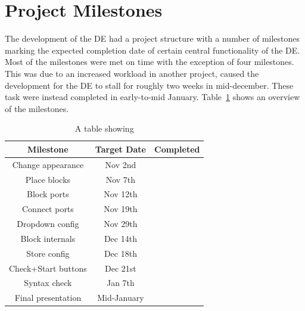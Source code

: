 \documentclass[journal,comsoc]{IEEEtran}
\begin{document}
%
\newpage
\appendices
\section{Project Milestones}
\label{app:milestones}
The development of the DE had a project structure with a number of milestones marking the
expected completion date of certain central functionality of the DE. Most of the milestones
were met on time with the exception of four milestones. This was due to an increased workload
in another project, caused the development for the DE to stall for roughly two weeks in
mid-december. These task were instead completed in early-to-mid January. Table~\ref{tab:milestones} shows an overview of the milestones.

\begin{table}[!ht]
\renewcommand{\arraystretch}{1.3}
\caption{A table showing}
\label{tab:milestones}
\centering
\begin{tabular}{|c|c|c|} \hline
		\textbf{Milestone} & \textbf{Target Date} & \textbf{Completed} \\ \hline
		Change appearance & Nov 2nd & \color{green}{In Time} \\ \hline
		Place blocks & Nov 7th & \color{green}{In Time} \\ \hline
		Block ports & Nov 12th & \color{green}{In Time} \\ \hline
		Connect ports & Nov 19th & \color{green}{In Time} \\ \hline
		Dropdown config & Nov 29th & \color{green}{In Time} \\ \hline
		Block internals & Dec 14th & \color{blue}{Early/Mid January} \\ \hline
		Store config & Dec 18th & \color{blue}{Early/Mid January} \\ \hline
		Check+Start buttons & Dec 21st & \color{blue}{Early/Mid January} \\ \hline
		Syntax check & Jan 7th & \color{blue}{Early/Mid January} \\ \hline
		Final presentation & Mid-January & \color{green}{Done} \\ \hline
\end{tabular}
\end{table}

\end{document}
